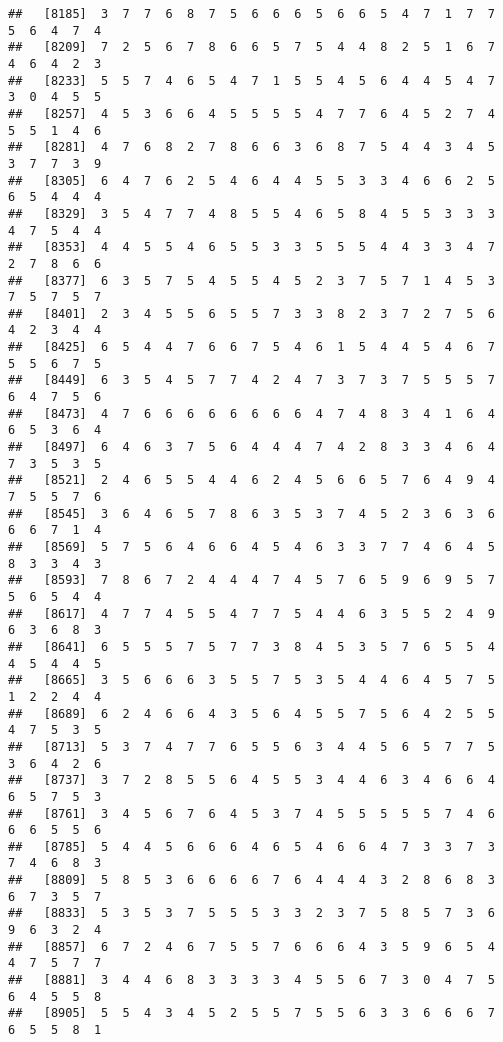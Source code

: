 \documentclass[
]{book}
\begin{document}
\begin{verbatim}
##   [8185]  3  7  7  6  8  7  5  6  6  6  5  6  6  5  4  7  1  7  7  5  6  4  7  4
##   [8209]  7  2  5  6  7  8  6  6  5  7  5  4  4  8  2  5  1  6  7  4  6  4  2  3
##   [8233]  5  5  7  4  6  5  4  7  1  5  5  4  5  6  4  4  5  4  7  3  0  4  5  5
##   [8257]  4  5  3  6  6  4  5  5  5  5  4  7  7  6  4  5  2  7  4  5  5  1  4  6
##   [8281]  4  7  6  8  2  7  8  6  6  3  6  8  7  5  4  4  3  4  5  3  7  7  3  9
##   [8305]  6  4  7  6  2  5  4  6  4  4  5  5  3  3  4  6  6  2  5  6  5  4  4  4
##   [8329]  3  5  4  7  7  4  8  5  5  4  6  5  8  4  5  5  3  3  3  4  7  5  4  4
##   [8353]  4  4  5  5  4  6  5  5  3  3  5  5  5  4  4  3  3  4  7  2  7  8  6  6
##   [8377]  6  3  5  7  5  4  5  5  4  5  2  3  7  5  7  1  4  5  3  7  5  7  5  7
##   [8401]  2  3  4  5  5  6  5  5  7  3  3  8  2  3  7  2  7  5  6  4  2  3  4  4
##   [8425]  6  5  4  4  7  6  6  7  5  4  6  1  5  4  4  5  4  6  7  5  5  6  7  5
##   [8449]  6  3  5  4  5  7  7  4  2  4  7  3  7  3  7  5  5  5  7  6  4  7  5  6
##   [8473]  4  7  6  6  6  6  6  6  6  6  4  7  4  8  3  4  1  6  4  6  5  3  6  4
##   [8497]  6  4  6  3  7  5  6  4  4  4  7  4  2  8  3  3  4  6  4  7  3  5  3  5
##   [8521]  2  4  6  5  5  4  4  6  2  4  5  6  6  5  7  6  4  9  4  7  5  5  7  6
##   [8545]  3  6  4  6  5  7  8  6  3  5  3  7  4  5  2  3  6  3  6  6  6  7  1  4
##   [8569]  5  7  5  6  4  6  6  4  5  4  6  3  3  7  7  4  6  4  5  8  3  3  4  3
##   [8593]  7  8  6  7  2  4  4  4  7  4  5  7  6  5  9  6  9  5  7  5  6  5  4  4
##   [8617]  4  7  7  4  5  5  4  7  7  5  4  4  6  3  5  5  2  4  9  6  3  6  8  3
##   [8641]  6  5  5  5  7  5  7  7  3  8  4  5  3  5  7  6  5  5  4  4  5  4  4  5
##   [8665]  3  5  6  6  6  3  5  5  7  5  3  5  4  4  6  4  5  7  5  1  2  2  4  4
##   [8689]  6  2  4  6  6  4  3  5  6  4  5  5  7  5  6  4  2  5  5  4  7  5  3  5
##   [8713]  5  3  7  4  7  7  6  5  5  6  3  4  4  5  6  5  7  7  5  3  6  4  2  6
##   [8737]  3  7  2  8  5  5  6  4  5  5  3  4  4  6  3  4  6  6  4  6  5  7  5  3
##   [8761]  3  4  5  6  7  6  4  5  3  7  4  5  5  5  5  5  7  4  6  6  6  5  5  6
##   [8785]  5  4  4  5  6  6  6  4  6  5  4  6  6  4  7  3  3  7  3  7  4  6  8  3
##   [8809]  5  8  5  3  6  6  6  6  7  6  4  4  4  3  2  8  6  8  3  6  7  3  5  7
##   [8833]  5  3  5  3  7  5  5  5  3  3  2  3  7  5  8  5  7  3  6  9  6  3  2  4
##   [8857]  6  7  2  4  6  7  5  5  7  6  6  6  4  3  5  9  6  5  4  4  7  5  7  7
##   [8881]  3  4  4  6  8  3  3  3  3  4  5  5  6  7  3  0  4  7  5  6  4  5  5  8
##   [8905]  5  5  4  3  4  5  2  5  5  7  5  5  6  3  3  6  6  6  7  6  5  5  8  1

\end{verbatim}
\end{document}
